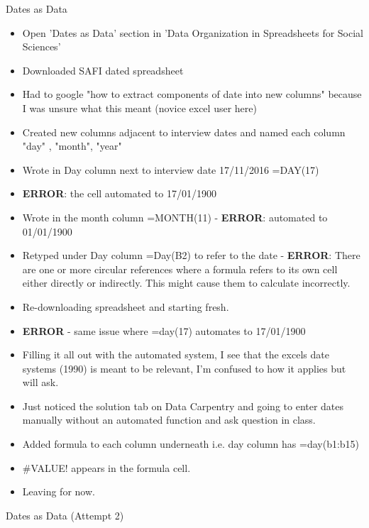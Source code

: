 \documentclass{article}
\begin{document}
Dates as Data 
\begin{itemize}
\item Open 'Dates as Data' section in 'Data Organization in Spreadsheets for Social Sciences'
\item Downloaded SAFI dated spreadsheet
\item Had to google "how to extract components of date into new columns" because I was unsure what this meant (novice excel user here)
\item Created new columns adjacent to interview dates and named each column "day" , "month", "year" 
\item Wrote in Day column next to interview date 17/11/2016 =DAY(17) 
\item \textbf{ERROR}: the cell automated to 17/01/1900
\item Wrote in the month column =MONTH(11) - \textbf{ERROR}: automated to 01/01/1900
\item Retyped under Day column =Day(B2) to refer to the date - \textbf{ERROR}: There are one or more circular references where a formula refers to its own cell either directly or indirectly. This might cause them to calculate incorrectly.
\item Re-downloading spreadsheet and starting fresh.
\item \textbf{ERROR} - same issue where =day(17) automates to 17/01/1900
\item Filling it all out with the automated system, I see that the excels date systems (1990) is meant to be relevant, I'm confused to how it applies but will ask.
\item Just noticed the solution tab on Data Carpentry and going to enter dates manually without an automated function and ask question in class.
\item Added formula to each column underneath i.e. day column has =day(b1:b15)
\item \#VALUE! appears in the formula cell. 
\item Leaving for now.
\end{itemize}

Dates as Data (Attempt 2)
\end{document}
